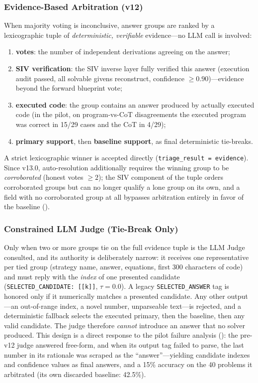 \documentclass[11pt,a4paper]{article}
\begin{document}
\subsubsection{Evidence-Based Arbitration (v12)}
\label{sec:evidence_arbitration}
When majority voting is inconclusive, answer groups are ranked by a lexicographic tuple of \emph{deterministic, verifiable} evidence---no LLM call is involved:
\begin{enumerate}[leftmargin=*,itemsep=1pt]
    \item \textbf{votes}: the number of independent derivations agreeing on the answer;
    \item \textbf{SIV verification}: the SIV inverse layer fully verified this answer (execution audit passed, all solvable givens reconstruct, confidence $\geq 0.90$)---evidence beyond the forward blueprint vote;
    \item \textbf{executed code}: the group contains an answer produced by actually executed code (in the pilot, on program-vs-CoT disagreements the executed program was correct in 15/29 cases and the CoT in 4/29);
    \item \textbf{primary support}, then \textbf{baseline support}, as final deterministic tie-breaks.
\end{enumerate}
A strict lexicographic winner is accepted directly (\texttt{triage\_result = evidence}).
Since v13.0, auto-resolution additionally requires the winning group to be \emph{corroborated} (honest votes $\geq 2$); the SIV component of the tuple orders corroborated groups but can no longer qualify a lone group on its own, and a field with no corroborated group at all bypasses arbitration entirely in favor of the baseline ().
\subsubsection{Constrained LLM Judge (Tie-Break Only)}
Only when two or more groups tie on the full evidence tuple is the LLM Judge consulted, and its authority is deliberately narrow: it receives one representative per tied group (strategy name, answer, equations, first 300 characters of code) and must reply with the \emph{index} of one presented candidate (\texttt{SELECTED\_CANDIDATE:~[[k]]}, $\tau=0.0$).
A legacy \texttt{SELECTED\_ANSWER} tag is honored only if it numerically matches a presented candidate.
Any other output---an out-of-range index, a novel number, unparseable text---is rejected, and a deterministic fallback selects the executed primary, then the baseline, then any valid candidate.
The judge therefore \emph{cannot} introduce an answer that no solver produced.
This design is a direct response to the pilot failure analysis (): the pre-v12 judge answered free-form, and when its output tag failed to parse, the last number in its rationale was scraped as the ``answer''---yielding candidate indexes and confidence values as final answers, and a 15\% accuracy on the 40 problems it arbitrated (its own discarded baseline: 42.5\%).
\end{document}
